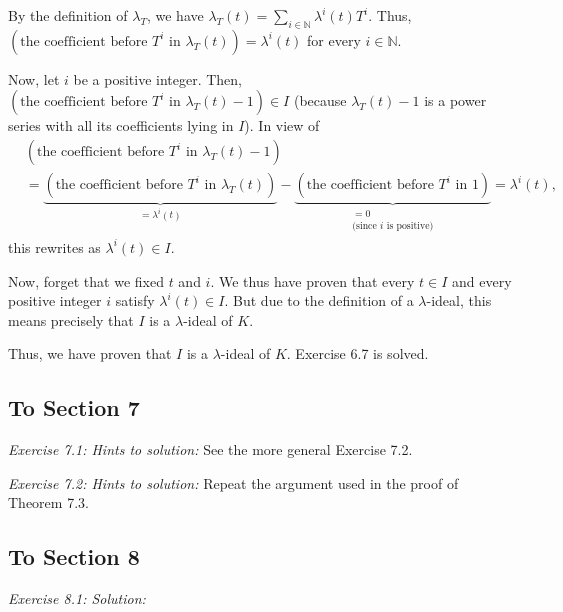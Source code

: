 \documentclass[numbers=enddot,12pt,final,onecolumn,notitlepage]{scrartcl}%
\begin{document}
By the definition of $\lambda_{T}$, we have $\lambda_{T}\left(  t\right)
=\sum\limits_{i\in\mathbb{N}}\lambda^{i}\left(  t\right)  T^{i}$. Thus,
$\left(  \text{the coefficient before }T^{i}\text{ in }\lambda_{T}\left(
t\right)  \right)  =\lambda^{i}\left(  t\right)  $ for every $i\in\mathbb{N}$.

Now, let $i$ be a positive integer. Then, $\left(  \text{the coefficient
before }T^{i}\text{ in }\lambda_{T}\left(  t\right)  -1\right)  \in I$
(because $\lambda_{T}\left(  t\right)  -1$ is a power series with all its
coefficients lying in $I$). In view of%
\begin{align*}
&  \left(  \text{the coefficient before }T^{i}\text{ in }\lambda_{T}\left(
t\right)  -1\right) \\
&  =\underbrace{\left(  \text{the coefficient before }T^{i}\text{ in }%
\lambda_{T}\left(  t\right)  \right)  }_{=\lambda^{i}\left(  t\right)
}-\underbrace{\left(  \text{the coefficient before }T^{i}\text{ in }1\right)
}_{\substack{=0\\\text{(since }i\text{ is positive)}}}=\lambda^{i}\left(
t\right)  ,
\end{align*}
this rewrites as $\lambda^{i}\left(  t\right)  \in I$.

Now, forget that we fixed $t$ and $i$. We thus have proven that every $t\in I$
and every positive integer $i$ satisfy $\lambda^{i}\left(  t\right)  \in I$.
But due to the definition of a $\lambda$-ideal, this means precisely that $I$
is a $\lambda$-ideal of $K$.

Thus, we have proven that $I$ is a $\lambda$-ideal of $K$. Exercise 6.7 is solved.

\subsection{To Section 7}

\textit{Exercise 7.1: Hints to solution:} See the more general Exercise 7.2.

\textit{Exercise 7.2: Hints to solution:} Repeat the argument used in the
proof of Theorem 7.3.

\subsection{To Section 8}

\textit{Exercise 8.1: Solution:}
\end{document}
